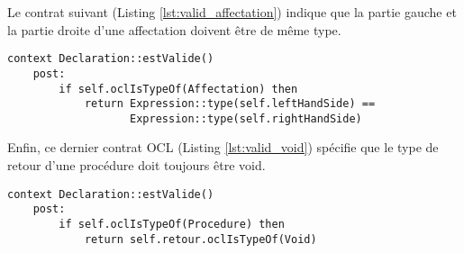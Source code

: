 Le contrat suivant (Listing \ref{lst:valid_affectation}) indique que la partie gauche et la partie droite d'une affectation doivent être de même type.

\begin{lstlisting}[caption=Contrat OCL spécifiant que la partie gauche et droite d'une affectation ont le même type,captionpos=b,label={lst:valid_affectation},language=OCL]
context Declaration::estValide()
	post:
		if self.oclIsTypeOf(Affectation) then
			return Expression::type(self.leftHandSide) == 
				   Expression::type(self.rightHandSide)
\end{lstlisting}

Enfin, ce dernier contrat OCL (Listing \ref{lst:valid_void}) spécifie que le type de retour d'une procédure doit toujours être \textsf{void}.

\begin{lstlisting}[caption=Contrat OCL indiquant que le type de retour d'une procédure est toujours void,captionpos=b,label={lst:valid_void},language=OCL]
context Declaration::estValide()
	post:
		if self.oclIsTypeOf(Procedure) then
			return self.retour.oclIsTypeOf(Void)
\end{lstlisting}
